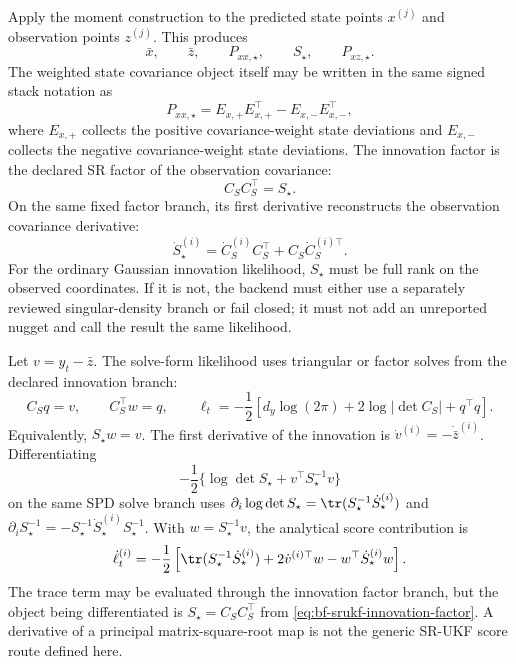 Apply the moment construction to the predicted state points \(x^{(j)}\) and
observation points \(z^{(j)}\).  This produces
\[
  \bar x,\qquad
  \bar z,\qquad
  P_{xx,\star},\qquad
  S_\star,\qquad
  P_{xz,\star}.
\]
The weighted state covariance object itself may be written in the same signed
stack notation as
\begin{equation}
\label{eq:bf-srukf-state-signed-covariance-stack}
  P_{xx,\star}=E_{x,+}E_{x,+}^\top-E_{x,-}E_{x,-}^\top,
\end{equation}
where \(E_{x,+}\) collects the positive covariance-weight state deviations and
\(E_{x,-}\) collects the negative covariance-weight state deviations.  The
innovation factor is the declared SR factor of the observation covariance:
\begin{equation}
\label{eq:bf-srukf-innovation-factor}
  C_S C_S^\top=S_\star .
\end{equation}
On the same fixed factor branch, its first derivative reconstructs the
observation covariance derivative:
\begin{equation}
\label{eq:bf-srukf-innovation-factor-first}
  \dot S_\star^{(i)}
  =
  \dot C_S^{(i)}C_S^\top+C_S\dot C_S^{(i)\top}.
\end{equation}
For the ordinary Gaussian innovation likelihood, \(S_\star\) must be full rank
on the observed coordinates.  If it is not, the backend must either use a
separately reviewed singular-density branch or fail closed; it must not add an
unreported nugget and call the result the same likelihood.

Let \(v=y_t-\bar z\).  The solve-form likelihood uses triangular or factor
solves from the declared innovation branch:
\begin{equation}
\label{eq:bf-srukf-loglik-solve}
  C_S q=v,\qquad C_S^\top w=q,\qquad
  \ell_t
  =
  -\frac12
  \left[
    d_y\log(2\pi)+2\log|\det C_S|+q^\top q
  \right].
\end{equation}
Equivalently, \(S_\star w=v\).  The first derivative of the innovation is
\(\dot v^{(i)}=-\dot{\bar z}^{(i)}\).  Differentiating
\[
  -\frac12\{\log\det S_\star+v^\top S_\star^{-1}v\}
\]
on the same SPD solve branch uses
\(\partial_i\log\det S_\star=\tr(S_\star^{-1}\dot S_\star^{(i)})\) and
\(\partial_i S_\star^{-1}
=-S_\star^{-1}\dot S_\star^{(i)}S_\star^{-1}\).  With
\(w=S_\star^{-1}v\), the analytical score contribution is
\begin{equation}
\label{eq:bf-srukf-score-first}
  \dot\ell_t^{(i)}
  =
  -\frac12
  \left[
    \tr(S_\star^{-1}\dot S_\star^{(i)})
    +2\dot v^{(i)\top}w
    -w^\top\dot S_\star^{(i)}w
  \right].
\end{equation}
The trace term may be evaluated through the innovation factor branch, but the
object being differentiated is \(S_\star=C_SC_S^\top\) from
\eqref{eq:bf-srukf-innovation-factor}.  A derivative of a principal
matrix-square-root map is not the generic SR-UKF score route defined here.

